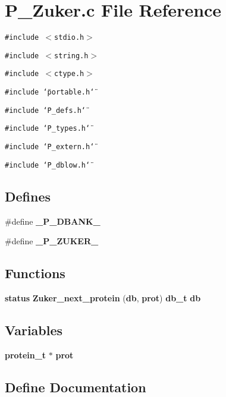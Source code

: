 \section{P\_\-Zuker.c File Reference}
\label{P__Zuker_8c}
{\tt \#include $<$stdio.h$>$}\par
{\tt \#include $<$string.h$>$}\par
{\tt \#include $<$ctype.h$>$}\par
{\tt \#include \char`\"{}portable.h\char`\"{}}\par
{\tt \#include \char`\"{}P\_\-defs.h\char`\"{}}\par
{\tt \#include \char`\"{}P\_\-types.h\char`\"{}}\par
{\tt \#include \char`\"{}P\_\-extern.h\char`\"{}}\par
{\tt \#include \char`\"{}P\_\-dblow.h\char`\"{}}\par
\subsection*{Defines}
\begin{CompactItemize}
\item 
\#define {\bf \_\-P\_\-DBANK\_\-}
\item 
\#define {\bf \_\-P\_\-ZUKER\_\-}
\end{CompactItemize}
\subsection*{Functions}
\begin{CompactItemize}
\item 
{\bf status} {\bf Zuker\_\-next\_\-protein} ({\bf db}, {\bf prot}) {\bf db\_\-t} {\bf db}
\end{CompactItemize}
\subsection*{Variables}
\begin{CompactItemize}
\item 
{\bf protein\_\-t} $\ast$ {\bf prot}
\end{CompactItemize}


\subsection{Define Documentation}
